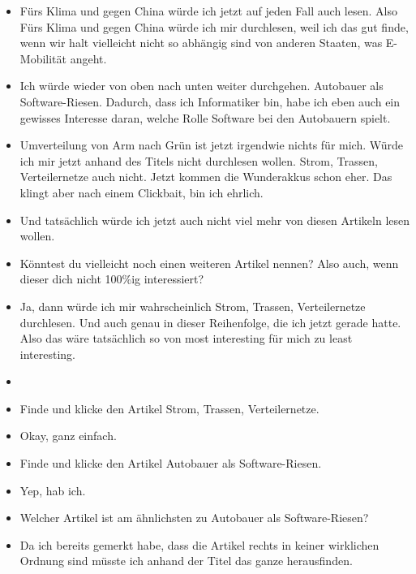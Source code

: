 {\begin{itemize}[]
            \item {} \flqq Fürs Klima und gegen China\frqq{} würde ich jetzt auf jeden Fall auch lesen.
                  Also \flqq Fürs Klima und gegen China\frqq{} würde ich mir durchlesen, weil ich das gut finde, wenn wir halt vielleicht nicht so abhängig sind von anderen Staaten, was E-Mobilität angeht.
            \item {} Ich würde wieder von oben nach unten weiter durchgehen.
                  \flqq Autobauer als Software-Riesen\frqq{}.
                  Dadurch, dass ich Informatiker bin, habe ich eben auch ein gewisses Interesse daran, welche Rolle Software bei den Autobauern spielt.
            \item {} \flqq Umverteilung von Arm nach Grün\frqq{} ist jetzt irgendwie nichts für mich. Würde ich mir jetzt anhand des Titels nicht durchlesen wollen.
                  \flqq Strom, Trassen, Verteilernetze\frqq{} auch nicht.
                  \flqq Jetzt kommen die Wunderakkus\frqq{} schon eher.
                  Das klingt aber nach einem Clickbait, bin ich ehrlich.
            \item {} Und tatsächlich würde ich jetzt auch nicht viel mehr von diesen Artikeln lesen wollen.
            \item {} Könntest du vielleicht noch einen weiteren Artikel nennen? Also auch, wenn dieser dich nicht 100\%ig interessiert?
            \item {} Ja, dann würde ich mir wahrscheinlich \flqq Strom, Trassen, Verteilernetze\frqq{} durchlesen.
                  Und auch genau in dieser Reihenfolge, die ich jetzt gerade hatte.
                  Also das wäre tatsächlich so von most interesting für mich zu least interesting.
            \item {}
            \item {} Finde und klicke den Artikel \flqq Strom, Trassen, Verteilernetze\frqq{}.
            \item {} Okay, ganz einfach.
            \item {} Finde und klicke den Artikel \flqq Autobauer als Software-Riesen\frqq{}.
            \item {} Yep, hab ich.
            \item {} Welcher Artikel ist am ähnlichsten zu \flqq Autobauer als Software-Riesen\frqq{}?
            \item {} Da ich bereits gemerkt habe, dass die Artikel rechts in keiner wirklichen Ordnung sind müsste ich anhand der Titel das ganze herausfinden.

\end{itemize}}
